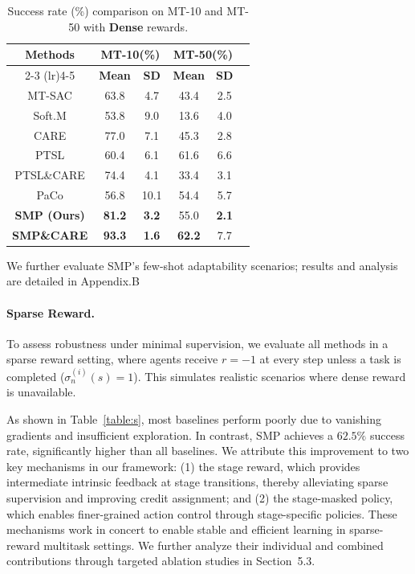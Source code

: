 \documentclass{article}
\begin{document}
\begin{table}[htbp]
  \centering
  \begin{tabular}{c cc ccc}
    \toprule
    \multirow{2}{*}{\textbf{Methods}} & 
    \multicolumn{2}{c}{\textbf{MT-10(\%)}} & 
    \multicolumn{2}{c}{\textbf{MT-50(\%)}} \\
    \cmidrule(lr){2-3} \cmidrule(lr){4-5}
    &  \textbf{Mean} & \textbf{SD} & 
     \textbf{Mean} & \textbf{SD} \\
    \midrule
    MT-SAC          & 63.8 & 4.7  & 43.4 & 2.5 \\
    Soft.M          & 53.8  & 9.0  & 13.6  & 4.0   \\
    CARE            & 77.0  & 7.1  & 45.3 & 2.8 \\
    PTSL            & 60.4 & 6.1  & 61.6  & 6.6   \\
    PTSL\&CARE      & 74.4  & 4.1  & 33.4  & 3.1 \\
    PaCo            & 56.8  & 10.1    & 54.4   & 5.7   \\
    \midrule
    \textbf{SMP (Ours)}     & \textbf{81.2} & \textbf{3.2} & 55.0  & \textbf{2.1}  \\
    \textbf{SMP\&CARE}       & \textbf{93.3} & \textbf{1.6} & \textbf{62.2}  & 7.7 \\
    \bottomrule
  \end{tabular}
    \caption{Success rate (\%) comparison on MT-10 and MT-50 with \textbf{Dense} rewards.}
      \label{table:d}
\end{table}



We further evaluate SMP’s few-shot adaptability scenarios; results and analysis are detailed in Appendix.B

\paragraph{Sparse Reward.}

To assess robustness under minimal supervision, we evaluate all methods in a sparse reward setting, where agents receive $r = -1$ at every step unless a task is completed ($\sigma^{(i)}_{n}(s)=1$). This simulates realistic scenarios where dense reward is unavailable.


As shown in Table~\ref{table:s}, most baselines perform poorly due to vanishing gradients and insufficient exploration. 
In contrast, SMP achieves a $62.5\%$ success rate, significantly higher than all baselines. 
We attribute this improvement to two key mechanisms in our framework: (1) the stage reward, which provides intermediate intrinsic feedback at stage transitions, thereby alleviating sparse supervision and improving credit assignment; and (2) the stage-masked policy, which enables finer-grained action control through stage-specific policies.
These mechanisms work in concert to enable stable and efficient learning in sparse-reward multitask settings. We further analyze their individual and combined contributions through targeted ablation studies in Section~5.3.
\end{document}
